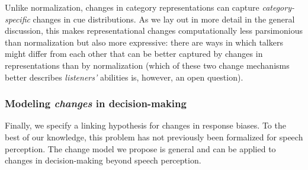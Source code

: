 \documentclass[
  11pt,
  man,floatsintext]{apa6}
\begin{document}
Unlike normalization, changes in category representations can capture \emph{category-specific} changes in cue distributions. As we lay out in more detail in the general discussion, this makes representational changes computationally less parsimonious than normalization but also more expressive: there are ways in which talkers might differ from each other that can be better captured by changes in representations than by normalization (which of these two change mechanisms better describes \emph{listeners'} abilities is, however, an open question).

\hypertarget{sec:change-bias}{%
\subsubsection{\texorpdfstring{Modeling \emph{changes} in decision-making}{Modeling changes in decision-making}}\label{sec:change-bias}}

Finally, we specify a linking hypothesis for changes in response biases. To the best of our knowledge, this problem has not previously been formalized for speech perception. The change model we propose is general and can be applied to changes in decision-making beyond speech perception.
\end{document}
